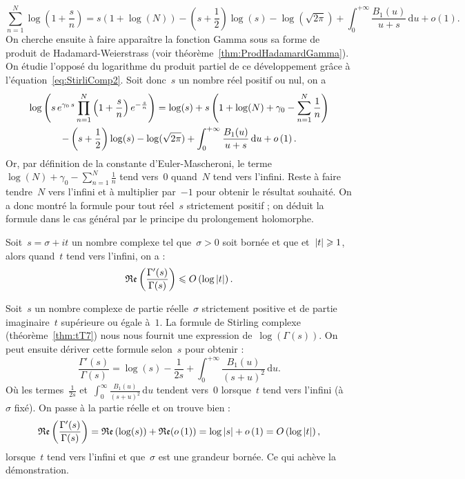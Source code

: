 \begin{dem}
			\begin{equation}\label{eq:StirliComp2}
				\sum_{n=1}^{N} \log\left(1+\frac{s}{n}\right) 
				 = s(1+\log(N)) - \left(s+\frac{1}{2}\right)\log(s) - \log(\sqrt{2\pi}) + \int_0^{+\infty} \frac{B_1(u)}{u+s}\,\mathrm{d}u + o(1).
			\end{equation}
			On cherche ensuite à faire apparaître la fonction Gamma sous sa forme de produit de Hadamard-Weierstrass (voir théorème~\ref{thm:ProdHadamardGamma}). On étudie l'opposé du logarithme du produit partiel de ce développement grâce à l'équation~\eqref{eq:StirliComp2}. Soit donc~$s$ un nombre réel positif ou nul, on a
			\begin{multline*}\label{eq:StirliComp3}
				\log\left(s\,e^{\gamma_0\,s} \prod_{n=1}^{N}\left(1+\frac{s}{n}\right)e^{-\frac{s}{n}}\right)
				= \log(s) + s\left(1+\log(N)+\gamma_0-\sum_{n=1}^{N}\frac{1}{n}\right) \\ 
				- \left(s+\frac{1}{2}\right)\log(s)
				- \log(\sqrt{2\pi}) + \int_0^{+\infty} \frac{B_1(u)}{u+s}\,\mathrm{d}u + o\left(1\right).
			\end{multline*}
			Or, par définition de la constante d'Euler-Mascheroni, le terme~$\log(N)+\gamma_0-\sum_{n=1}^{N} \frac{1}{n}$ tend vers~$0$ quand~$N$ tend vers l'infini. Reste à faire tendre~$N$ vers l'infini et à multiplier par~$-1$ pour obtenir le résultat souhaité. On a donc montré la formule pour tout réel~$s$ strictement positif ; on déduit la formule dans le cas général par le principe du prolongement holomorphe.
		\end{dem}
		\begin{lem}\label{lem:tL3}
			Soit~$s=\sigma+it$ un nombre complexe tel que~$\sigma>0$ soit bornée et que et~$\left\vert t\right\vert\geqslant 1$, alors quand~$t$ tend vers l'infini, on a :
			\[
				\mathfrak{Re}\left(\frac{\Gamma'(s)}{\Gamma(s)}\right) \leqslant O\left(\log\left\vert t\right\vert\right).
			\]
		\end{lem}
		\begin{dem}
			Soit~$s$ un nombre complexe de partie réelle~$\sigma$ strictement positive et de partie imaginaire~$t$ supérieure ou égale à~$1$. La formule de Stirling complexe (théorème~\ref{thm:tT7}) nous nous fournit une expression de~$\log(\Gamma(s))$. On peut ensuite dériver cette formule selon~$s$ pour obtenir :
			\[
				\frac{\Gamma'(s)}{\Gamma(s)} = \log(s) - \frac{1}{2s} + \int_{0}^{+\infty} \frac{B_1(u)}{(s+u)^2} \,\mathrm{d}u.
			\]
			Où les termes~$\frac{1}{2s}$ et~$\int_{0}^{\infty}\frac{B_1(u)}{(s+u)^2} \,\mathrm{d}u$ tendent vers~$0$ lorsque~$t$ tend vers l'infini (à~$\sigma$ fixé). On passe à la partie réelle et on trouve bien :
			\[
				\mathfrak{Re}\left(\frac{\Gamma'(s)}{\Gamma(s)}\right) 
					= \mathfrak{Re}\left(\log(s)\right) + \mathfrak{Re}(o\left(1\right))
					= \log\left\vert s\right\vert + o\left(1\right)
					= O\left(\log\left\vert t\right\vert\right),
			\]
			lorsque~$t$ tend vers l'infini et que~$\sigma$ est une grandeur bornée. Ce qui achève la démonstration.
		\end{dem}
